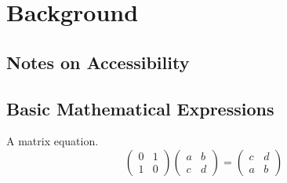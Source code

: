 
\chapter{Background}\label{ch:background}

\section{Notes on Accessibility}

\section{Basic Mathematical Expressions}\label{sec:intro_math}


A matrix equation.
\[
\begin{pmatrix}0&1\\1&0\end{pmatrix}
\begin{pmatrix}a&b\\c&d\end{pmatrix}
=
\begin{pmatrix}c&d\\a&b\end{pmatrix}
\]
